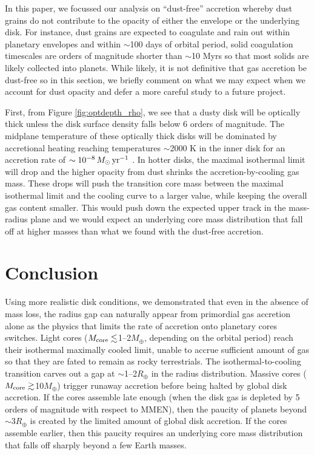 \documentclass[twocolumn]{aastex631}
\begin{document}
In this paper, we focussed our analysis on ``dust-free'' accretion whereby dust grains do not contribute to the opacity of either the envelope or the underlying disk. For instance, dust grains are expected to coagulate and rain out within planetary envelopes \citep[e.g.,][]{Mordasini14,Ormel14} and within $\sim$100 days of orbital period, solid coagulation timescales are orders of magnitude shorter than $\sim$10 Myrs so that most solids are likely collected into planets. While likely, it is not definitive that gas accretion be dust-free so in this section, we briefly comment on what we may expect when we account for dust opacity and defer a more careful study to a future project.

First, from Figure \ref{fig:optdepth_rho}, we see that a dusty disk will be optically thick unless the disk surface density falls below 6 orders of magnitude. The midplane temperature of these optically thick disks will be dominated by accretional heating reaching temperatures $\sim$2000 K in the inner disk for an accretion rate of $\sim 10^{-8}\,M_\odot\,{\rm yr}^{-1}$ \citep[see also][]{Jankovic21}. In hotter disks, the maximal isothermal limit will drop and the higher opacity from dust shrinks the accretion-by-cooling gas mass. These drops will push the transition core mass between the maximal isothermal limit and the cooling curve to a larger value, while keeping the overall gas content smaller. This would push down the expected upper track in the mass-radius plane and we would expect an underlying core mass distribution that fall off at higher masses than what we found with the dust-free accretion. 

\section{Conclusion}
\label{sec:concl}

Using more realistic disk conditions, we demonstrated that even in the absence of mass loss, the radius gap can naturally appear from primordial gas accretion alone as the physics that limits the rate of accretion onto planetary cores switches. Light cores ($M_{\rm core} \lesssim$1--2$M_\oplus$, depending on the orbital period) reach their isothermal maximally cooled limit, unable to accrue sufficient amount of gas so that they are fated to remain as rocky terrestrials. The isothermal-to-cooling transition carves out a gap at $\sim$1--2$R_\oplus$ in the radius distribution. Massive cores ($M_{\rm core} \gtrsim$10$M_\oplus$) trigger runaway accretion before being halted by global disk accretion. If the cores assemble late enough (when the disk gas is depleted by 5 orders of magnitude with respect to MMEN), then the paucity of planets beyond $\sim$3$R_\oplus$ is created by the limited amount of global disk accretion. If the cores assemble earlier, then this paucity requires an underlying core mass distribution that falls off sharply beyond a few Earth masses.
\end{document}
